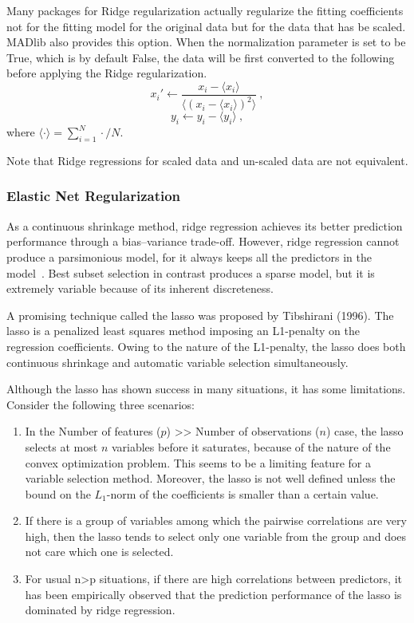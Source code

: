 Many packages for Ridge regularization actually regularize the fitting
coefficients not for the fitting model for the original data but for
the data that has be scaled. MADlib also provides this option. When
the normalization parameter is set to be True, which is by default
False, the data will be first converted to the following before
applying the Ridge regularization.
\begin{equation}
  x_i' \leftarrow \frac{x_i - \langle x_i \rangle}{\langle (x_i -
    \langle x_i \rangle)^2\rangle} \ ,
\end{equation}
\begin{equation}
y_i \leftarrow y_i - \langle y_i \rangle \ ,
\end{equation}
where $\langle \cdot \rangle = \sum_{i=1}^{N} \cdot / N$.

Note that Ridge regressions for scaled data and un-scaled data are not equivalent.

\subsubsection{Elastic Net Regularization} %
\label{ssub:elastic_net_regularization}
As a continuous shrinkage method, ridge regression achieves its better prediction performance through a bias–variance trade-off. However, ridge regression cannot produce a parsimonious model, for it always keeps all the predictors in the model~\cite{zou2005}. Best subset selection in contrast produces a sparse model, but it is extremely variable because of its inherent discreteness. 

A promising technique called the lasso was proposed by Tibshirani (1996). The 
lasso is a penalized least squares method imposing an L1-penalty on the 
regression coefficients. Owing to the nature of the L1-penalty, the lasso does 
both continuous shrinkage and automatic variable selection simultaneously.
 
Although the lasso has shown success in many situations, it has some 
limitations. Consider the following three scenarios: 
\begin{enumerate}
    \item In the Number of features ($p$) >> Number of observations ($n$) case, the lasso selects at most $n$ variables before it saturates, because of the nature of the convex optimization problem. This seems to be a limiting feature for a variable selection method. Moreover, the lasso is not well defined unless the bound on the $L_1$-norm of the coefficients is smaller than a certain value.
    \item If there is a group of variables among which the pairwise correlations are very high, then the lasso tends to select only one variable from the group and does not care which one is selected.
    \item For usual n>p situations, if there are high correlations between predictors, it has been empirically observed that the prediction performance of the lasso is dominated by ridge regression. 
\end{enumerate}

